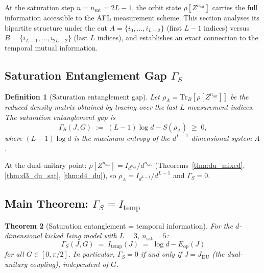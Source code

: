 \documentclass[12pt,a4paper]{article}
\newtheorem{theorem}{Theorem}[section]
\newtheorem{definition}[theorem]{Definition}
\begin{document}
At the saturation step $n=n_{\mathrm{sat}}=2L-1$, the orbit state $\rho[Z^{n_{\mathrm{sat}}}]$ carries
the full information accessible to the AFL measurement scheme.
This section analyses its bipartite structure under the cut
$A = \{i_0,\ldots,i_{L-2}\}$ (first $L-1$ indices) versus $B=\{i_{L-1},\ldots,i_{2L-2}\}$
(last $L$ indices), and establishes an exact connection to the temporal mutual information.

\subsection{Saturation Entanglement Gap $\Gamma_S$}
\label{subsec:sat_gap_def}

\begin{definition}[Saturation entanglement gap]
\label{def:gamma_S}
Let $\rho_A = \mathrm{Tr}_B[\rho[Z^{n_{\mathrm{sat}}}]]$ be the reduced density matrix
obtained by tracing over the last $L$ measurement indices.
The \emph{saturation entanglement gap} is
\[
  \Gamma_S(J,G) \;:=\; (L-1)\log d - S(\rho_A) \;\geq\; 0,
\]
where $(L-1)\log d$ is the maximum entropy of the $d^{L-1}$-dimensional system $A$.
\end{definition}

At the dual-unitary point: $\rho[Z^{n_{\mathrm{sat}}}]=I_{d^{n_{\mathrm{sat}}}}/d^{n_{\mathrm{sat}}}$
(Theorems~\ref{thm:du_mixed}, \ref{thm:d3_du_sat}, \ref{thm:d4_du}),
so $\rho_A=I_{d^{L-1}}/d^{L-1}$ and $\Gamma_S=0$.

\subsection{Main Theorem: $\Gamma_S = I_{\mathrm{temp}}$}
\label{subsec:gamma_equals_Itemp}

\begin{theorem}[Saturation entanglement = temporal information]
\label{thm:gamma_S_Itemp}
For the $d$-dimensional kicked Ising model with $L=3$, $n_{\mathrm{sat}}=5$:
\begin{equation}
  \boxed{\Gamma_S(J,G) \;=\; I_{\mathrm{temp}}(J) \;=\; \log d - E_{\mathrm{op}}(J)}
\end{equation}
for all $G\in[0,\pi/2]$. In particular, $\Gamma_S=0$ if and only if $J=J_{\mathrm{DU}}$
(the dual-unitary coupling), independent of $G$.
\end{theorem}
\end{document}
